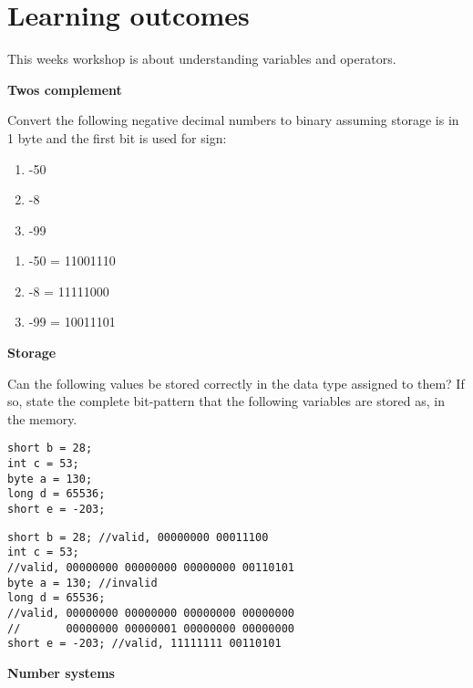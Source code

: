  
\section*{Learning outcomes}

This weeks workshop is about understanding variables and operators.

\vspace{1em}
\begin{questions}

\question \textbf{Twos complement}

Convert the following negative decimal numbers to binary assuming storage is in 1 byte and the first bit is used for sign:

\begin{enumerate}
\item -50
\item -8
\item -99
\end{enumerate}

\begin{solution}
\begin{enumerate}
\item -50 = 11001110
\item -8  = 11111000
\item -99 = 10011101
\end{enumerate}	
\end{solution}

\question \textbf{Storage}
\vskip 0.5cm

Can the following values be stored correctly in the data type assigned to them? If so, state the complete bit-pattern that the following variables are stored as, in the memory.

\begin{lstlisting}
short b = 28;
int c = 53;
byte a = 130;
long d = 65536;
short e = -203;
\end{lstlisting}

\begin{solution}
\begin{lstlisting}
short b = 28; //valid, 00000000 00011100
int c = 53; 
//valid, 00000000 00000000 00000000 00110101
byte a = 130; //invalid
long d = 65536; 
//valid, 00000000 00000000 00000000 00000000 
//       00000000 00000001 00000000 00000000
short e = -203; //valid, 11111111 00110101
\end{lstlisting}	
\end{solution}

\question \textbf{Number systems}
\vskip 0.5cm


\end{questions}
